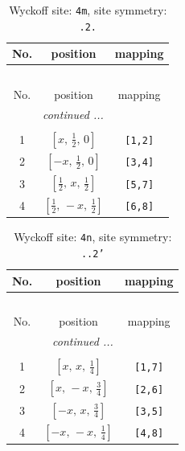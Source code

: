 \documentclass[fleqn,8pt]{jsarticle}
\begin{document}
\renewcommand{\arraystretch}{1.2}
\begin{longtable}{ccc}
\caption{Wyckoff site: {\tt 4m}, site symmetry: {\tt .2.}}
 \\
 \hline \hline
No. & position & mapping \\ \hline \endfirsthead

\multicolumn{2}{l}{\tablename\ \thetable{}} \\
 \hline \hline
No. & position & mapping \\ \hline \endhead

 \hline \hline
\multicolumn{2}{r}{\footnotesize\it continued ...} \\ \endfoot

 \hline \hline
\multicolumn{2}{r}{} \\ \endlastfoot

1 & $\left[ x,\, \frac{1}{2},\, 0 \right]$ & {\tt [1,2]} \\ \hline
2 & $\left[ - x,\, \frac{1}{2},\, 0 \right]$ & {\tt [3,4]} \\ \hline
3 & $\left[ \frac{1}{2},\, x,\, \frac{1}{2} \right]$ & {\tt [5,7]} \\ \hline
4 & $\left[ \frac{1}{2},\, - x,\, \frac{1}{2} \right]$ & {\tt [6,8]} \\
\end{longtable}
\renewcommand{\arraystretch}{1.2}
\begin{longtable}{ccc}
\caption{Wyckoff site: {\tt 4n}, site symmetry: {\tt ..2'}}
 \\
 \hline \hline
No. & position & mapping \\ \hline \endfirsthead

\multicolumn{2}{l}{\tablename\ \thetable{}} \\
 \hline \hline
No. & position & mapping \\ \hline \endhead

 \hline \hline
\multicolumn{2}{r}{\footnotesize\it continued ...} \\ \endfoot

 \hline \hline
\multicolumn{2}{r}{} \\ \endlastfoot

1 & $\left[ x,\, x,\, \frac{1}{4} \right]$ & {\tt [1,7]} \\ \hline
2 & $\left[ x,\, - x,\, \frac{3}{4} \right]$ & {\tt [2,6]} \\ \hline
3 & $\left[ - x,\, x,\, \frac{3}{4} \right]$ & {\tt [3,5]} \\ \hline
4 & $\left[ - x,\, - x,\, \frac{1}{4} \right]$ & {\tt [4,8]} \\
\end{longtable}
\end{document}
